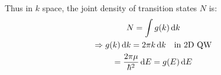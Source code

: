 \begin{parts}
	Thus in $k$ space, the joint density of transition states $N$ is:
	\begin{gather*}
		N = \int g(k) \,\mathrm{d}{k} \\
		\Rightarrow g(k) \,\mathrm{d}{k} = 2\pi k \,\mathrm{d}{k} \textnormal{\hspace{1em}in 2D QW} \\
		= \frac{2\pi\mu}{\hbar^2} \,\mathrm{d}{E} = g(E) \,\mathrm{d}{E}
	\end{gather*}
\end{parts}